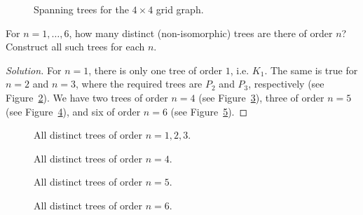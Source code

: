 \begin{figure}[!htbp]
\centering

\caption{Spanning trees for the $4 \times 4$ grid graph.}
\label{fig:trees_forests:grid_graph_spanning_trees}
\end{figure}

\begin{example}
For $n = 1, \dots, 6$, how many distinct (non-isomorphic) trees are
there of order $n$? Construct all such trees for each $n$.
\end{example}

\begin{proof}[Solution]
For $n = 1$, there is only one tree of order $1$, i.e. $K_1$. The same
is true for $n = 2$ and $n = 3$, where the required trees are $P_2$
and $P_3$, respectively (see
Figure~\ref{fig:trees_forests:distinct_trees_specified_order_1_2_3}). We
have two trees of order $n = 4$ (see
Figure~\ref{fig:trees_forests:distinct_trees_specified_order_4}),
three of order $n = 5$ (see
Figure~\ref{fig:trees_forests:distinct_trees_specified_order_5}), and
six of order $n = 6$ (see
Figure~\ref{fig:trees_forests:distinct_trees_specified_order_6}).
\end{proof}

\begin{figure}[!htbp]
\centering

\caption{All distinct trees of order $n = 1, 2, 3$.}
\label{fig:trees_forests:distinct_trees_specified_order_1_2_3}
\end{figure}

\begin{figure}[!htbp]
\centering

\caption{All distinct trees of order $n = 4$.}
\label{fig:trees_forests:distinct_trees_specified_order_4}
\end{figure}

\begin{figure}[!htbp]
\centering

\caption{All distinct trees of order $n = 5$.}
\label{fig:trees_forests:distinct_trees_specified_order_5}
\end{figure}

\begin{figure}[!htbp]
\centering

\caption{All distinct trees of order $n = 6$.}
\label{fig:trees_forests:distinct_trees_specified_order_6}
\end{figure}


